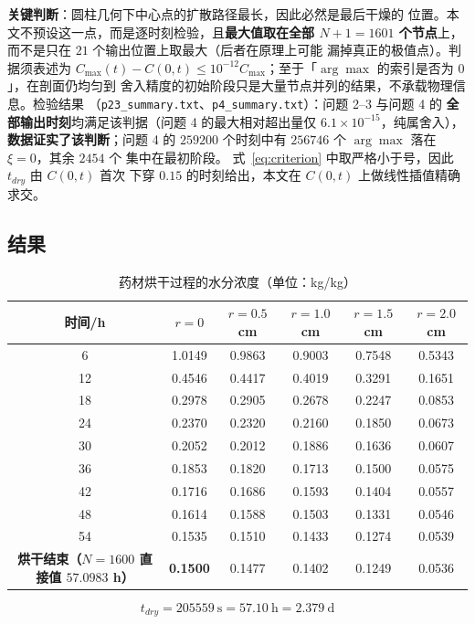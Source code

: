 \textbf{关键判断}：圆柱几何下中心点的扩散路径最长，因此必然是最后干燥的
位置。本文不预设这一点，而是逐时刻检验，且\textbf{最大值取在全部
$N+1=1601$ 个节点}上，而不是只在 $21$ 个输出位置上取最大（后者在原理上可能
漏掉真正的极值点）。判据须表述为 $C_{\max}(t)-C(0,t)\le
10^{-12}C_{\max}$；至于「$\arg\max$ 的索引是否为 $0$」，在剖面仍均匀到
舍入精度的初始阶段只是大量节点并列的结果，不承载物理信息。检验结果
（\texttt{p23\_summary.txt}、\texttt{p4\_summary.txt}）：问题 2--3 与问题 4 的
\textbf{全部输出时刻}均满足该判据（问题 4 的最大相对超出量仅
$6.1\times10^{-15}$，纯属舍入），\textbf{数据证实了该判断}；问题 4 的
$259200$ 个时刻中有 $256746$ 个 $\arg\max$ 落在 $\xi=0$，其余 $2454$ 个
集中在最初阶段。
式~\eqref{eq:criterion} 中取严格小于号，因此 $t_{dry}$ 由 $C(0,t)$ 首次
下穿 $0.15$ 的时刻给出，本文在 $C(0,t)$ 上做线性插值精确求交。

\subsection{结果}

\begin{table}[htbp]
\centering
\caption{药材烘干过程的水分浓度（单位：kg/kg）}
\label{tab:p3}
\footnotesize
\begin{tabular}{cccccc}
\toprule[1.5pt]
时间/h & $r=0$ & $r=0.5$ cm & $r=1.0$ cm & $r=1.5$ cm & $r=2.0$ cm \\
\midrule[1pt]
6  & 1.0149 & 0.9863 & 0.9003 & 0.7548 & 0.5343 \\
12 & 0.4546 & 0.4417 & 0.4019 & 0.3291 & 0.1651 \\
18 & 0.2978 & 0.2905 & 0.2678 & 0.2247 & 0.0853 \\
24 & 0.2370 & 0.2320 & 0.2160 & 0.1850 & 0.0673 \\
30 & 0.2052 & 0.2012 & 0.1886 & 0.1636 & 0.0607 \\
36 & 0.1853 & 0.1820 & 0.1713 & 0.1500 & 0.0575 \\
42 & 0.1716 & 0.1686 & 0.1593 & 0.1404 & 0.0557 \\
48 & 0.1614 & 0.1588 & 0.1503 & 0.1331 & 0.0546 \\
54 & 0.1535 & 0.1510 & 0.1433 & 0.1274 & 0.0539 \\
\textbf{烘干结束（$N=1600$ 直接值 $57.0983$ h）} & \textbf{0.1500} & 0.1477 & 0.1402 & 0.1249 & 0.0536 \\
\bottomrule[1.5pt]
\end{tabular}
\end{table}

\begin{equation}
\boxed{\ t_{dry}=205559\ \mathrm{s}=57.10\ \mathrm{h}=2.379\ \mathrm{d}\ }
\end{equation}

